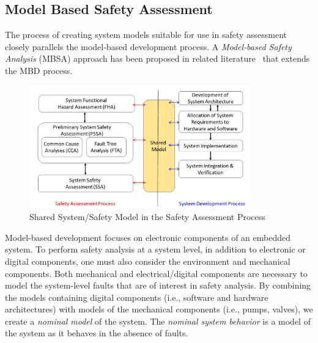 \subsection{Model Based Safety Assessment}
\label{subsec:mbsa}
The process of creating system models suitable for use in safety assessment closely parallels the model-based development process. A \emph{Model-based Safety Analysis} (MBSA) approach has been proposed in related literature~\cite{Joshi05:Dasc, joshi2008behavioral, criticalembeddedsystems} that extends the MBD process. 

\begin{figure}[h]
	\centering
	\includegraphics[trim=0 5 0 5,clip,width=0.85\textwidth]{images/process5.JPG}
	\caption{Shared System/Safety Model in the Safety Assessment Process}
	\label{fig:proposed_safety_process}
\end{figure}

Model-based development focuses on electronic components of an embedded system. To perform safety analysis at a system level, in addition to electronic or digital components, one must also consider the environment and mechanical components. Both mechanical and electrical/digital components are necessary to model the system-level faults that are of interest in safety analysis. By combining the models containing digital components (i.e., software and hardware architectures) with models of the mechanical components (i.e., pumps, valves), we create a \emph{nominal model} of the system. The \emph{nominal system behavior} is a model of the system as it behaves in the absence of faults. 

